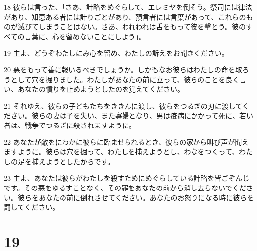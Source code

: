 \par 18 彼らは言った、「さあ、計略をめぐらして、エレミヤを倒そう。祭司には律法があり、知恵ある者には計りごとがあり、預言者には言葉があって、これらのものが滅びてしまうことはない。さあ、われわれは舌をもって彼を撃とう。彼のすべての言葉に、心を留めないことにしよう」。
\par 19 主よ、どうぞわたしにみ心を留め、わたしの訴えをお聞きください。
\par 20 悪をもって善に報いるべきでしょうか。しかもなお彼らはわたしの命を取ろうとして穴を掘りました。わたしがあなたの前に立って、彼らのことを良く言い、あなたの憤りを止めようとしたのを覚えてください。
\par 21 それゆえ、彼らの子どもたちをききんに渡し、彼らをつるぎの刃に渡してください。彼らの妻は子を失い、また寡婦となり、男は疫病にかかって死に、若い者は、戦争でつるぎに殺されますように。
\par 22 あなたが敵をにわかに彼らに臨ませられるとき、彼らの家から叫び声が聞えますように。彼らは穴を掘って、わたしを捕えようとし、わなをつくって、わたしの足を捕えようとしたからです。
\par 23 主よ、あなたは彼らがわたしを殺すためにめぐらしている計略を皆ごぞんじです。その悪をゆるすことなく、その罪をあなたの前から消し去らないでください。彼らをあなたの前に倒れさせてください。あなたのお怒りになる時に彼らを罰してください。

\chapter{19}


